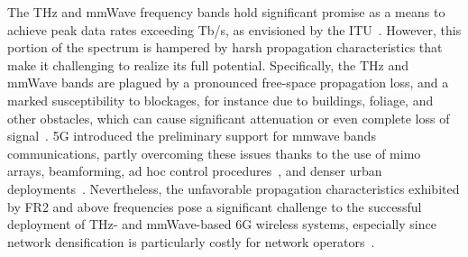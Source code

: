 The THz and mmWave frequency bands hold significant promise as a means to achieve peak data rates exceeding Tb/s, as envisioned by the ITU~\cite{imt2030}. However, this portion of the spectrum is hampered by harsh propagation characteristics that make it challenging to realize its full potential.
Specifically, the THz and mmWave bands are plagued by a pronounced free-space propagation loss, and a marked susceptibility to blockages, for instance due to buildings, foliage, and other obstacles, which can cause significant attenuation or even complete loss of signal~\cite{han2018propagation, jornet2011channel}.
5G introduced the preliminary support for \gls{mmwave} bands communications, partly overcoming these issues thanks to the use of \gls{mimo} arrays, beamforming, ad hoc control procedures~\cite{heng2021six}, and denser urban deployments~\cite{polese2020toward}.
Nevertheless, the unfavorable propagation characteristics exhibited by FR2 and above frequencies pose a significant challenge to the successful deployment of THz- and mmWave-based 6G wireless systems, especially since network densification is particularly costly for network operators~\cite{lopez2015towards}.

